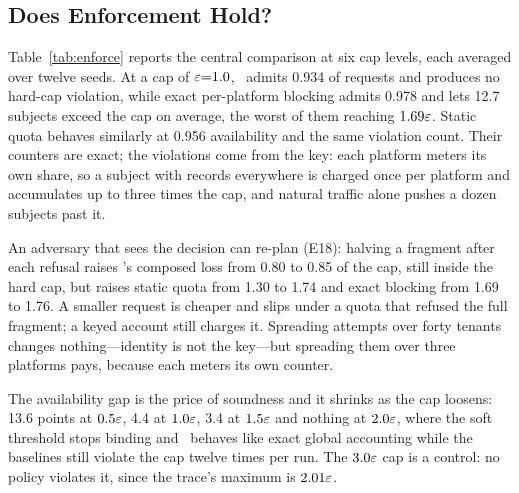 \subsection{Does Enforcement Hold?}
\label{sec:eval-enforce}

Table~\ref{tab:enforce} reports the central comparison at six cap levels, each
averaged over twelve seeds. At a cap of $\varepsilon{=}1.0$, \sys\ admits 0.934 of requests
and produces no hard-cap violation, while exact per-platform blocking admits 0.978 and
lets 12.7 subjects exceed the cap on average, the worst of them reaching $1.69\varepsilon$.
Static quota behaves similarly at 0.956 availability and the same violation count.
Their counters are exact; the violations come from the key: each platform meters
its own share, so a subject with records everywhere is charged once per platform and
accumulates up to three times the cap, and natural traffic alone pushes a dozen
subjects past it.

An adversary that sees the decision can re-plan (E18): halving a fragment after each
refusal raises \sys's composed loss from 0.80 to 0.85 of the cap, still inside the
hard cap, but raises static quota from 1.30 to 1.74 and exact blocking from 1.69 to
1.76. A smaller request is cheaper and slips under a quota that refused the full
fragment; a keyed account still charges it. Spreading attempts over forty tenants changes
nothing---identity is not the key---but spreading them over three platforms pays,
because each meters its own counter.

The availability gap is the price of soundness and it shrinks as the cap loosens:
13.6 points at $0.5\varepsilon$, 4.4 at $1.0\varepsilon$, 3.4 at $1.5\varepsilon$ and nothing at
$2.0\varepsilon$, where the soft threshold stops binding and \sys\ behaves like exact global
accounting while the baselines still violate the cap twelve times per run. The
$3.0\varepsilon$ cap is a control: no policy violates it, since the trace's maximum is
$2.01\varepsilon$.

